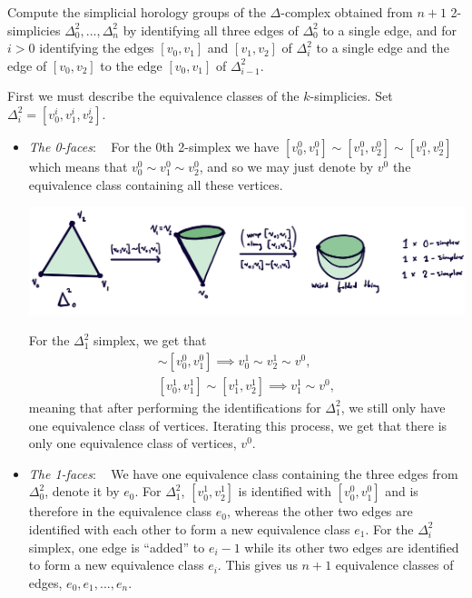 \begin{homework}[e]
\prob[2.1.6] Compute the simplicial horology groups of the $\Delta$-complex obtained from $n+1$ 2-simplicies $\Delta^2_0,...,\Delta^2_n$ by identifying all three edges of $\Delta_0^2$ to a single edge, and for $i > 0$ identifying the edges $[v_0,v_1]$ and $[v_1,v_2]$ of $\Delta_i^2$ to a single edge and the edge of $[v_0,v_2]$ to the edge $[v_0,v_1]$ of $\Delta_{i-1}^2$.
  \begin{prf}
    First we must describe the equivalence classes of the $k$-simplicies. Set $\Delta^2_i = [v_0^i,v_1^i,v_2^i]$.
    \begin{itemize}
      \item \emph{The 0-faces}: ~ For the 0th 2-simplex we have $[v^0_0,v_1^0] \sim [v_1^0,v_2^0]\sim [v_1^0,v^0_2]$ which means that $v^0_0 \sim v^0_1 \sim v^0_2$, and so we may just denote by $v^0$ the equivalence class containing all these vertices.
      \begin{center}
        \includegraphics[width=15cm]{figures/hwk8-fig2.png}
        \label{fig:prob2-1}
      \end{center}
      For the $\Delta^2_1$ simplex, we get that
      \begin{align*}
        [v_0^1,v_2^1] \sim [v_0^0, v_1^0] \implies v^1_0 \sim v_2^1 \sim v^0, \\
        [v_0^1,v_1^1] \sim [v_1^1,v_2^1] \implies v^1_1\sim v^0,
      \end{align*}
      meaning that after performing the identifications for $\Delta_1^2$, we still only have one equivalence class of vertices. Iterating this process, we get that there is only one equivalence class of vertices, $v^0$.

      \item \emph{The 1-faces}: ~ We have one equivalence class containing the three edges from $\Delta^2_0$, denote it by $e_0$. For $\Delta^2_1$, $[v_0^1,v_2^1]$ is identified with $[v_0^0,v_1^0]$ and is therefore in the equivalence class $e_0$, whereas the other two edges are identified with each other to form a new equivalence class $e_1$. For the $\Delta^2_i$ simplex, one edge is ``added'' to $e_i-1$ while its other two edges are identified to form a new equivalence class $e_i$. This gives us $n+1$ equivalence classes of edges, $e_0,e_1,...,e_n$.


\end{itemize}
\end{prf}
\end{homework}
